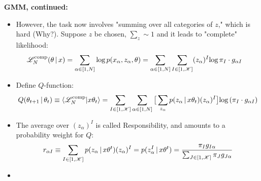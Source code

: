 \begin{frame} [t]
      {\bf GMM, continued:}
\begin{itemize}
    \item However, the task now involves 
       "summing over all categories of $z$," 
       which is hard (Why?). Suppose $z$ be
       chosen, $\sum _{z} \sim 1$ 
       and it leads to "complete" likelihood:
       { \footnotesize
       \begin{align*}
          \mathscr {L} _{N} ^{\text {comp}}
          ( \theta \,\vert\, x )
        & =
          \sum _{\alpha \in [1, N]}
          \textnormal{log}\,   
            p ( x _{\alpha}, 
                z _{\alpha}, \theta)
        = 
          \sum _{\alpha \in [1, N]}
          \sum _{I \in [1, \mathscr{K}]}
            ( z _{\alpha} ) ^{I}
          \textnormal{log}\, 
             \pi _{I} \cdot
             g _{\alpha I} 
       \end{align*} 
       }
    \item Define $Q$-function: 
        { \footnotesize 
        \begin{align*}
          Q ( \theta _{t + 1} \,\vert\, \theta _{t} )
         \equiv 
          \braket 
           {\mathscr {L} _{N} ^{\textnormal {comp}}}
           {x \theta _{t}}
         = 
          \sum _{I \in [1, \mathscr{K}] }
          \sum _{\alpha \in [1, N]}
          \big[
          \sum _{z _{\alpha}} 
           p ( z _{\alpha} \,\vert\, x \theta _{t} )
            ( z _{\alpha} ) ^{I}
          \big]
          \textnormal{log}\, 
            ( \pi _{I} \cdot
              g _{\alpha I} 
            )
        \end{align*}
        }
    \item The average over 
       $(z _{\alpha}) ^{I}$ is called 
       Responsibility, and amounts to 
       a probability weight for $Q$:
       { \footnotesize
       \begin{align*}
          r _{\alpha I}
        \equiv 
          \sum _{I \in [1, \mathscr{K}]} 
           p ( z _{\alpha} \,\vert\, x \theta ^{t} )
            ( z _{\alpha} ) ^{I}
        =
           p ( z _{\alpha} ^{I} \,\vert\, x \theta ^{t} )
        =
         \frac 
          { \pi _{I} g _{I \alpha}
          }
          { \sum _{J \in [1, \mathscr{K}]}
            \pi _{J}
            g _{J \alpha}
          }
       \end{align*}
       }
    \item 

\end{itemize}
\end{frame}
